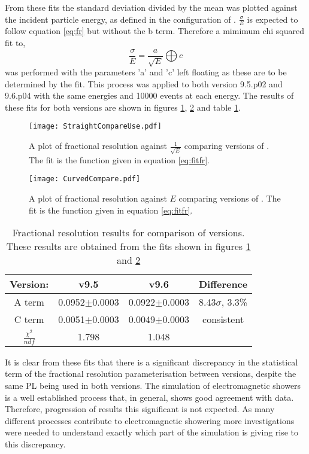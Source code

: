 From these fits the standard deviation divided by the mean was plotted against the incident particle energy, as defined in the configuration of \geant.  $\frac{\sigma}{E}$ is expected to follow equation \ref{eq:fr} but without the b term. Therefore a mimimum chi squared fit to,
\begin{equation}
  \label{eq:fitfr}
  \frac{\sigma}{E}=\frac{a}{\sqrt{E}}\bigoplus c
\end{equation}
was performed with the parameters 'a' and 'c' left floating as these are to be determined by the fit.  This process was applied to both \geant version 9.5.p02 and 9.6.p04 with the same energies and 10000 events at each energy.  The results of these fits for both \geant versions are shown in figures \ref{fig:straightres}, \ref{fig:coolres} and table \ref{tab:results}.
\begin{figure}[h]
  \centering
  \texttt{[image: StraightCompareUse.pdf]}
  \caption{A plot of fractional resolution against $\frac{1}{\sqrt{E}}$ comparing versions of \geant. The fit is the function given in equation \ref{eq:fitfr}.}
  \label{fig:straightres}
\end{figure}
\begin{figure}[h]
  \centering
  \texttt{[image: CurvedCompare.pdf]}
  \caption{A plot of fractional resolution against $E$ comparing versions of \geant. The fit is the function given in equation \ref{eq:fitfr}.}
  \label{fig:coolres}
\end{figure}

\begin{table}[h]
  \centering
  \begin{tabular}{|c|c|c|c|}
      \hline
      Version: & v9.5 & v9.6 & Difference  \\ \hline
      A term    & 0.0952$\pm$0.0003 & 0.0922$\pm$0.0003  & 8.43$\sigma$, 3.3\% \\ \hline
      C term    & 0.0051$\pm$0.0003 & 0.0049$\pm$0.0003 & consistent \\ \hline
      $\frac{\chi^2}{ndf}$   &1.798  & 1.048 &  \\ \hline
  \end{tabular}
  \caption{Fractional resolution results for comparison of \geant versions.  These results are obtained from the fits shown in figures \ref{fig:straightres} and \ref{fig:coolres}}
  \label{tab:results}
\end{table}

It is clear from these fits that there is a significant discrepancy in the statistical term of the fractional resolution parameterisation between \geant versions, despite the same PL being used in both versions.  The simulation of electromagnetic showers is a well established process that, in general, shows good agreement with data.  Therefore, progression of results this significant is not expected.  As many different processes contribute to electromagnetic showering more investigations were needed to understand exactly which part of the simulation is giving rise to this discrepancy.

